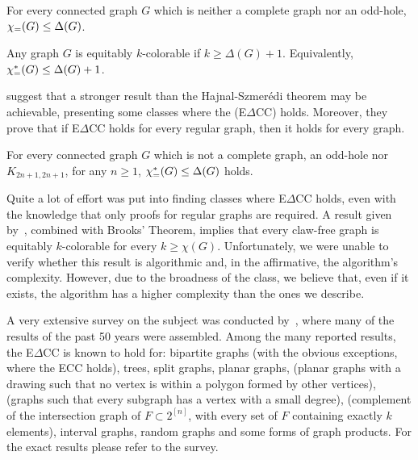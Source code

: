 \begin{conjecture*}[ECC]
    For every connected graph $G$ which is neither a complete graph nor an odd-hole, $\chi_{\mathcal{=}}(G) \leq \Delta(G)$.
\end{conjecture*}

\begin{theorem*}
    Any graph $G$ is equitably $k$-colorable if $k \geq \Delta(G) + 1$. Equivalently, $\chi_{\mathcal{=}}^*(G) \leq \Delta(G) + 1$.
\end{theorem*}

\citep{e_delta_cc} suggest that a stronger result than the Hajnal-Szmerédi theorem may be achievable, presenting some classes where the  (E$\Delta$CC) holds.
Moreover, they prove that if E$\Delta$CC holds for every regular graph, then it holds for every graph.

\begin{conjecture*}[E$\Delta$CC]
    For every connected graph $G$ which is not a complete graph, an odd-hole nor $K_{2n+1, 2n+1}$, for any $n \geq 1$, $\chi_{\mathcal{=}}^*(G) \leq \Delta(G)$ holds.
\end{conjecture*}

Quite a lot of effort was put into finding classes where E$\Delta$CC holds, even with the knowledge that only proofs for regular graphs are required.
A result given by~\citep{claw_free_de_werra}, combined with Brooks' Theorem, implies that every claw-free graph is equitably $k$-colorable for every $k \geq \chi(G)$.
Unfortunately, we were unable to verify whether this result is algorithmic and, in the affirmative, the algorithm's complexity.
However, due to the broadness of the class, we believe that, even if it exists, the algorithm has a higher complexity than the ones we describe.

A very extensive survey on the subject was conducted by~\citep{equitable_survey}, where many of the results of the past 50 years were assembled.
Among the many reported results, the E$\Delta$CC is known to hold for:
bipartite graphs (with the obvious exceptions, where the ECC holds),
trees,
split graphs,
planar graphs,
 (planar graphs with a drawing such that no vertex is within a polygon formed by other vertices),
 (graphs such that every subgraph has a vertex with a small degree),
 (complement of the intersection graph of $F \subset 2^{[n]}$, with every set of $F$ containing exactly $k$ elements),
interval graphs,
random graphs and
some forms of graph products.
For the exact results please refer to the survey.


